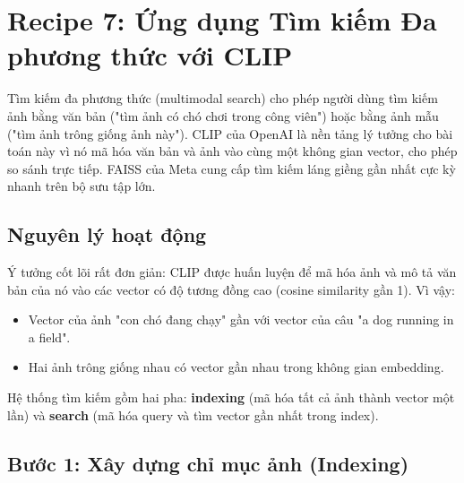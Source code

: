 \section{Recipe 7: Ứng dụng Tìm kiếm Đa phương thức với CLIP}
\label{sec:recipe_clip_search}

Tìm kiếm đa phương thức (multimodal search) cho phép người dùng tìm kiếm ảnh bằng văn bản ("tìm ảnh có chó chơi trong công viên") hoặc bằng ảnh mẫu ("tìm ảnh trông giống ảnh này"). CLIP của OpenAI là nền tảng lý tưởng cho bài toán này vì nó mã hóa văn bản và ảnh vào cùng một không gian vector, cho phép so sánh trực tiếp. FAISS của Meta cung cấp tìm kiếm láng giềng gần nhất cực kỳ nhanh trên bộ sưu tập lớn.

\subsection{Nguyên lý hoạt động}
\label{subsec:clip_principle}

Ý tưởng cốt lõi rất đơn giản: CLIP được huấn luyện để mã hóa ảnh và mô tả văn bản của nó vào các vector có độ tương đồng cao (cosine similarity gần 1). Vì vậy:

\begin{itemize}
    \item Vector của ảnh "con chó đang chạy" gần với vector của câu "a dog running in a field".
    \item Hai ảnh trông giống nhau có vector gần nhau trong không gian embedding.
\end{itemize}

Hệ thống tìm kiếm gồm hai pha: \textbf{indexing} (mã hóa tất cả ảnh thành vector một lần) và \textbf{search} (mã hóa query và tìm vector gần nhất trong index).

\subsection{Bước 1: Xây dựng chỉ mục ảnh (Indexing)}
\label{subsec:clip_indexing}

